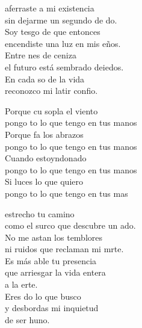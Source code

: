 \begin{cancion}%
	 aferraste a mi existencia  \\
	sin dejarme un segundo de do.  \\
	Soy tesgo de que entonces  \\
	encendiste una luz en mis eños.  \\
	Entre nes de ceniza \\
	el futuro está sembrado deiedos.  \\
	En cada so de la vida \\
	reconozco mi latir confio.\jump\\
	\begin{chorus}%
		Porque cu sopla el viento  \\
		pongo to lo que tengo en tus manos\\
		Porque fa los abrazos  \\
		pongo to lo que tengo en tus manos\\
		Cuando estoyndonado  \\
		pongo to lo que tengo en tus manos\\
		Si luces lo que quiero  \\
		pongo to lo que tengo en tus mas\jump\\
	\end{chorus}%
	 estrecho tu camino \\
	como el surco que descubre un ado. \\
	No me astan los temblores \\
	ni ruidos que reclaman mi mrte.\\
	Es más able tu presencia \\
	\jump
que arriesgar la vida entera\\
	a la erte.\\
	Eres do lo que busco \\
	\jump
y desbordas mi inquietud\\
	de ser huno.\\
\end{cancion}%
